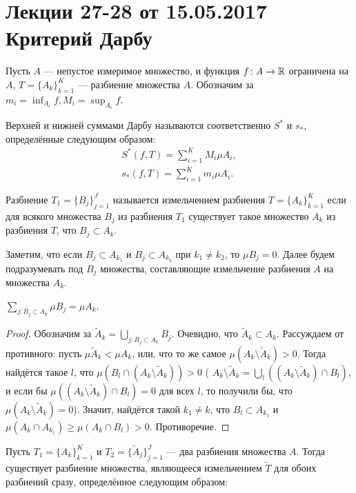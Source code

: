 \pagestyle{fancy}
\section{Лекции 27-28 от 15.05.2017 \\ Критерий Дарбу}
Пусть $A$ --- непустое измеримое множество, и функция $f\colon A \to \mathbb{R}$ ограничена на $A$, $T = \{A_k\}_{k =1}^{K}$ --- разбиение множества $A$. Обозначим за $m_i = \inf_{A_i} f, M_i = \sup_{A_i} f$.
\begin{Def}
    Верхней и нижней суммами Дарбу называются соответственно $S^*$ и $s_*$, определённые следующим образом:
\begin{gather}
    S^*(f, T) = \sum\limits_{i =1}^{K} M_i \mu A_i,\\
    s_*(f, T) = \sum\limits_{i =1}^{K} m_i \mu A_i.
\end{gather}
\end{Def}
\begin{Def}
    Разбиение $T_1 = \{B_j\}_{j =1}^{J}$ называется измельчением разбиения $T = \{A_k\}_{k=1}^{K}$ если для всякого множества $B_j$ из разбиения $T_1$ существует такое множество $A_k$ из разбиения $T$, что $B_j \subset A_k$. 
\end{Def}
Заметим, что если $B_j \subset A_{k_1}$ и $B_j \subset A_{k_2}$ при $k_1 \neq k_2$, то $\mu B_j = 0$. Далее будем подразумевать под $B_j$ множества, составляющие измельчение разбиения $A$ на множества $A_k$. 
\begin{Statement}
    $\sum \limits_{j\colon B_j \subset A_k}\mu B_j = \mu A_k$.
\end{Statement}
\begin{proof}
    Обозначим за $\widetilde{A}_k = \bigcup\limits_{j\colon B_j \subset A_k}B_j$. Очевидно, что $\widetilde{A}_k \subset A_k$. Рассуждаем от противного: пусть $\mu \widetilde{A}_k < \mu A_k$, или, что то же самое $ \mu(A_k\setminus \widetilde{A}_k ) > 0$. Тогда найдётся такое $l$, что $\mu (B_l \cap (A_k \setminus \widetilde{A}_k)) > 0$ ( $A_k \setminus \widetilde{A}_k = \bigcup\limits_{l}((A_k \setminus \widetilde{A}_k)\cap B_l)$, и если бы $\mu((A_k \setminus \widetilde{A}_k)\cap B_l) = 0$ для всех $l$, то получили бы, что $\mu(A_k \setminus \widetilde{A}_k) = 0$). Значит, найдётся такой $k_1 \neq k$, что $B_l \subset A_{k_1}$ и $\mu(A_k \cap A_{k_1}) \geqslant \mu(A_k \cap B_l) > 0$. Противоречие.
\end{proof}
Пусть $T_1 = \{A_k\}_{k =1}^{K}$ и $T_2 = \{\widetilde{A}_j\}_{j=1}^{J}$ --- два разбиения множества $A$. Тогда существует разбиение множества, являющееся измельчением $\widetilde{T}$ для обоих разбиений сразу, определённое следующим образом:
